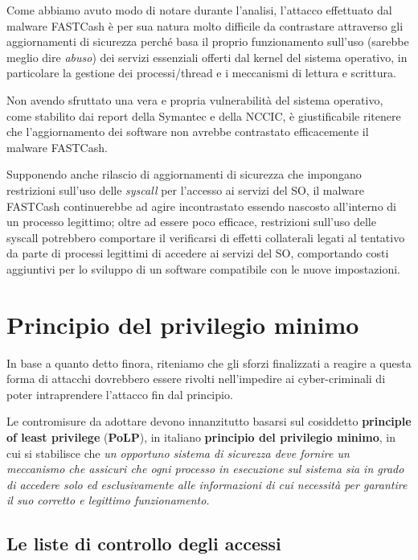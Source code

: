 \documentclass[10pt,a4paper, titlepage]{report}
\begin{document}
Come abbiamo avuto modo di notare durante l'analisi, l'attacco effettuato dal malware FASTCash è per sua natura  molto difficile da contrastare attraverso gli aggiornamenti di sicurezza perché basa il proprio funzionamento sull'uso (sarebbe meglio dire \textit{abuso}) dei servizi essenziali offerti dal kernel del sistema operativo, in particolare la gestione dei processi/thread e i meccanismi di lettura e scrittura. 

Non avendo sfruttato una vera e propria vulnerabilità del sistema operativo, come stabilito dai report della Symantec e della NCCIC, è giustificabile ritenere che l'aggiornamento dei software non avrebbe contrastato efficacemente il malware FASTCash. 

Supponendo anche rilascio di aggiornamenti di sicurezza che impongano restrizioni sull'uso delle \textit{syscall} per l'accesso ai servizi del SO, il malware FASTCash continuerebbe ad agire incontrastato essendo nascosto all'interno di un processo legittimo; oltre ad essere poco efficace, restrizioni sull'uso delle syscall potrebbero comportare il verificarsi di effetti collaterali legati al tentativo da parte di processi legittimi di accedere ai servizi del SO, comportando costi aggiuntivi per lo sviluppo di un software compatibile con le nuove impostazioni. 

\section{Principio del privilegio minimo}

In base a quanto detto finora, riteniamo che gli sforzi finalizzati a reagire a questa forma di attacchi dovrebbero essere rivolti nell'impedire ai cyber-criminali di poter intraprendere l'attacco fin dal principio. 

Le contromisure da adottare devono innanzitutto basarsi sul cosiddetto \textbf{principle of least privilege} (\textbf{PoLP}), in italiano \textbf{principio del privilegio minimo}, in cui si stabilisce che \textit{un opportuno sistema di sicurezza deve fornire un meccanismo che assicuri che ogni processo in esecuzione sul sistema sia in grado di accedere solo ed esclusivamente alle informazioni di cui necessità per garantire il suo corretto e legittimo funzionamento.}

\subsection{Le liste di controllo degli accessi}
\end{document}
